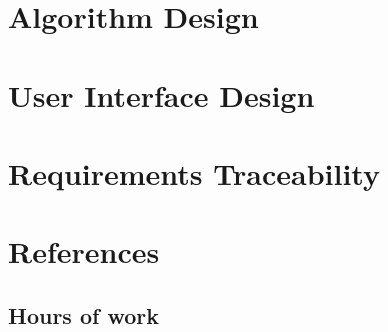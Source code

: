 \chapter{Algorithm Design}

\chapter{User Interface Design}

\chapter{Requirements Traceability}

\chapter{References}

\begin{appendices}

\chapter{Hours of work}

\end{appendices}